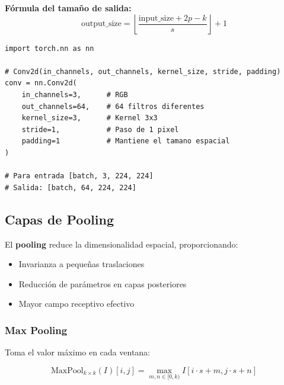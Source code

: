 \documentclass[12pt,a4paper]{article}
\begin{document}
\textbf{Fórmula del tamaño de salida:}
\begin{equation}
\text{output\_size} = \left\lfloor \frac{\text{input\_size} + 2p - k}{s} \right\rfloor + 1
\end{equation}

\begin{lstlisting}[caption={Capa convolucional en PyTorch}]
import torch.nn as nn

# Conv2d(in_channels, out_channels, kernel_size, stride, padding)
conv = nn.Conv2d(
    in_channels=3,      # RGB
    out_channels=64,    # 64 filtros diferentes
    kernel_size=3,      # Kernel 3x3
    stride=1,           # Paso de 1 pixel
    padding=1           # Mantiene el tamano espacial
)

# Para entrada [batch, 3, 224, 224]
# Salida: [batch, 64, 224, 224]
\end{lstlisting}

\subsection{Capas de Pooling}

El \textbf{pooling} reduce la dimensionalidad espacial, proporcionando:
\begin{itemize}
    \item Invarianza a pequeñas traslaciones
    \item Reducción de parámetros en capas posteriores
    \item Mayor campo receptivo efectivo
\end{itemize}

\subsubsection{Max Pooling}

Toma el valor máximo en cada ventana:

\begin{equation}
\text{MaxPool}_{k \times k}(I)[i,j] = \max_{m,n \in [0,k)} I[i \cdot s + m, j \cdot s + n]
\end{equation}
\end{document}
